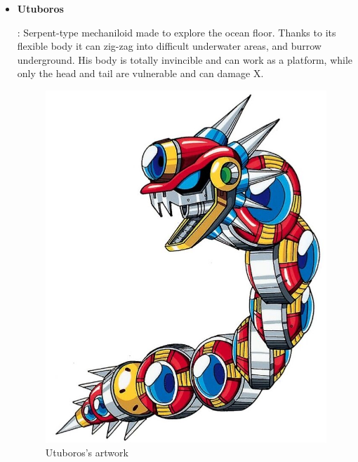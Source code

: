 \begin{itemize}
		\item \hypertarget{miniboss:Utuboros}{\textbf{Utuboros}}: Serpent-type mechaniloid made to explore the ocean floor. Thanks to its flexible body it can zig-zag into difficult underwater areas, and burrow underground. His body is totally invincible and can work as a platform, while only the head and tail are vulnerable and can damage X.
		\begin{figure}[htp]
			\centering
			\includegraphics[width=0.4\linewidth]{figures/X1/Enemies/Utuboros.jpg}
			\caption{Utuboros's artwork}
		\end{figure}
	\end{itemize}



